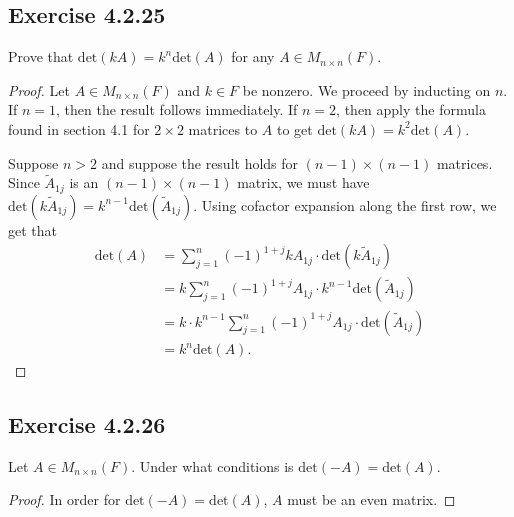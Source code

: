 \subsection*{Exercise 4.2.25} Prove that \( \text{det}(kA) = k^{n} \text{det}(A) \) for any \( A \in {M}_{n \times n}(F) \).
\begin{proof}
Let \( A \in {M}_{n \times n}(F) \) and \( k \in F  \) be nonzero. We proceed by inducting on \( n  \). If \( n = 1  \), then the result follows immediately. If \( n = 2  \), then apply the formula found in section 4.1 for \( 2 \times 2  \) matrices to \( A  \) to get \( \text{det}(kA) = k^{2} \text{det}(A) \). 

Suppose \( n > 2  \) and suppose the result holds for \( (n-1) \times (n-1) \) matrices. Since \( {\tilde{A}}_{1j} \) is an \( (n-1) \times (n-1)  \) matrix, we must have \( \text{det}({k\tilde{A}}_{1j}) = k^{n-1} \text{det}({\tilde{A}}_{1j})  \). Using cofactor expansion along the first row, we get that 
\begin{align*}
    \text{det}(A) &= \sum_{ j=1 }^{ n } (-1)^{1 + j} {kA}_{1j} \cdot \text{det}(k {\tilde{A}}_{1j})  \\
                  &= k \sum_{ j=1 }^{ n } (-1)^{1+j } {A}_{1j} \cdot k^{n-1} \text{det}({\tilde{A}}_{1j}) \\
                  &=  k \cdot k^{n-1} \sum_{ j=1 }^{ n }(-1)^{1+j} {A}_{1j} \cdot \text{det}({\tilde{A}}_{1j}) \\
                  &= k^{n} \text{det}(A).
\end{align*}
\end{proof}

\subsection*{Exercise 4.2.26} Let \( A \in {M}_{n \times n}(F) \). Under what conditions is \( \text{det}(-A) = \text{det}(A) \).
\begin{proof}
In order for \( \text{det}(-A) = \text{det}(A) \), \( A  \) must be an even matrix.
\end{proof}

